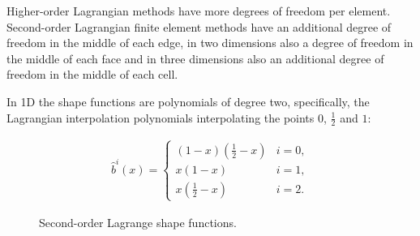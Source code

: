 Higher-order Lagrangian methods have more degrees of freedom per element.
Second-order Lagrangian finite element methods have an additional degree of freedom
in the middle of each edge, in two dimensions also a degree of freedom in the middle of each face
and in three dimensions also an additional degree of freedom in the middle of each cell.

In 1D the shape functions are polynomials of degree two,
specifically, the Lagrangian interpolation polynomials interpolating the points
$0$, $\frac{1}{2}$ and $1$:

\begin{align}
    \label{eq:lagrange_1d_2nd}
    \hat{b}^i(x) = \begin{cases}
                       (1-x)(\frac{1}{2} - x) & i=0, \\
                       x(1-x)                 & i=1, \\
                       x(\frac{1}{2} - x)     & i=2.
                   \end{cases}
\end{align}

\begin{figure}[h]
    \centering
    \caption{Second-order Lagrange shape functions.}
    \label{fig:2_lagrange_1d}
\end{figure}

